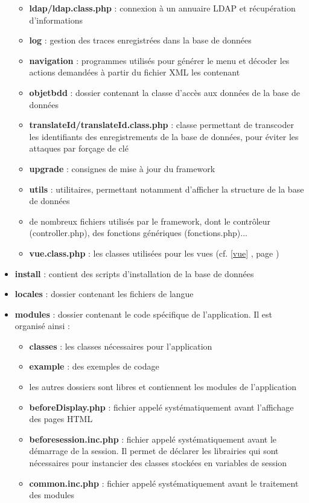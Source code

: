 \begin{itemize}
\begin{itemize}
\item \textbf{ldap/ldap.class.php} : connexion à un annuaire LDAP et récupération d'informations
\item \textbf{log} : gestion des traces enregistrées dans la base de données
\item \textbf{navigation} : programmes utilisés pour générer le menu et décoder les actions demandées à partir du fichier XML les contenant
\item \textbf{objetbdd} : dossier contenant la classe d'accès aux données de la base de données
\item \textbf{translateId/translateId.class.php} : classe permettant de transcoder les identifiants des enregistrements de la base de données, pour éviter les attaques par forçage de clé
\item \textbf{upgrade} : consignes de mise à jour du framework
\item \textbf{utils} : utilitaires, permettant notamment d'afficher la structure de la base de données
\item de nombreux fichiers utilisés par le framework, dont le contrôleur (controller.php), des fonctions génériques (fonctions.php)...
\item \textbf{vue.class.php} : les classes utilisées pour les vues (cf. \ref{vue} \textit{}, page \pageref{vue})
\end{itemize}
\item \textbf{install} : contient des scripts d'installation de la base de données
\item \textbf{locales} : dossier contenant les fichiers de langue
\item \textbf{modules} : dossier contenant le code spécifique de l'application. Il est organisé ainsi :
\begin{itemize}
\item \textbf{classes} : les classes nécessaires pour l'application
\item \textbf{example} : des exemples de codage
\item les autres dossiers sont libres et contiennent les modules de l'application
\item \textbf{beforeDisplay.php} : fichier appelé systématiquement avant l'affichage des pages HTML
\item \textbf{beforesession.inc.php} : fichier appelé systématiquement avant le démarrage de la session. Il permet de déclarer les librairies qui sont nécessaires pour instancier des classes stockées en variables de session
\item \textbf{common.inc.php} : fichier appelé systématiquement avant le traitement des modules

\end{itemize}
\end{itemize}
